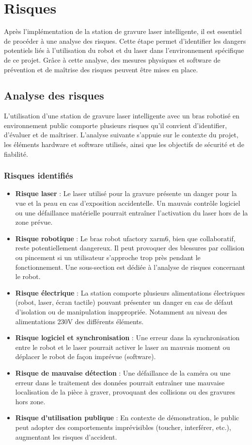 \chapter{Risques}
\label{chap:risques}

Après l'implémentation de la station de gravure laser intelligente, il est essentiel de procéder à une analyse des risques. Cette étape permet d'identifier les dangers potentiels liés à l'utilisation du robot et du laser dans l'environnement spécifique de ce projet. Grâce à cette analyse, des mesures physiques et \gls{software} de prévention et de maîtrise des risques peuvent être mises en place.

\section{Analyse des risques}
L'utilisation d'une station de gravure laser intelligente avec un bras robotisé en environnement public comporte plusieurs risques qu'il convient d'identifier, d'évaluer et de maîtriser. L'analyse suivante s'appuie sur le contexte du projet, les éléments \gls{hardware} et \gls{software} utilisés, ainsi que les objectifs de sécurité et de fiabilité.

\subsection{Risques identifiés}
\begin{itemize}
    \item \textbf{Risque laser} : Le laser utilisé pour la gravure présente un danger pour la vue et la peau en cas d'exposition accidentelle. Un mauvais contrôle logiciel ou une défaillance matérielle pourrait entraîner l'activation du laser hors de la zone prévue.
    \item \textbf{Risque robotique} : Le bras robot \gls{ufactory} \gls{xarm6}, bien que collaboratif, reste potentiellement dangereux. Il peut provoquer des blessures par collision ou pincement si un utilisateur s'approche trop près pendant le fonctionnement. Une sous-section est dédiée à l'analyse de risques concernant le robot.
    \item \textbf{Risque électrique} : La station comporte plusieurs alimentations électriques (robot, laser, écran tactile) pouvant présenter un danger en cas de défaut d'isolation ou de manipulation inappropriée. Notamment au niveau des alimentations 230V des différents éléments.
    \item \textbf{Risque logiciel et synchronisation} : Une erreur dans la synchronisation entre le robot et le laser pourrait activer le laser au mauvais moment ou déplacer le robot de façon imprévue (\gls{software}).
    \item \textbf{Risque de mauvaise détection} : Une défaillance de la caméra ou une erreur dans le traitement des données pourrait entraîner une mauvaise localisation de la pièce à graver, provoquant des collisions ou des gravures hors zone.
    \item \textbf{Risque d'utilisation publique} : En contexte de démonstration, le public peut adopter des comportements imprévisibles (toucher, interférer, etc.), augmentant les risques d'accident.
\end{itemize}

